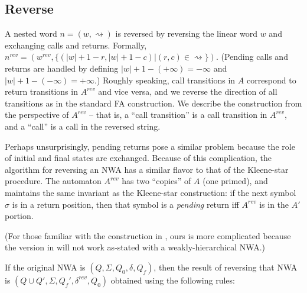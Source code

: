 \subsection{Reverse}
\label{Se:Reverse}

A nested word $n = (w, \rightsquigarrow)$ is reversed by reversing the linear
word $w$ and exchanging calls and returns. Formally,
$n^{rev} = (w^{rev}, \{(|w|+1-r, |w|+1-c) | (r,c)
\in\rightsquigarrow\})$. (Pending calls and returns are handled by defining
$|w|+1-(+\infty) = -\infty$ and $|w|+1-(-\infty) = +\infty$.) Roughly
speaking, call transitions in $A$ correspond to return transitions in
$A^{rev}$ and vice versa, and we reverse the direction of all transitions as
in the standard FA construction. We describe the construction from the
perspective of $A^{rev}$ -- that is, a ``call transition'' is a call
transition in $A^{rev}$, and a ``call'' is a call in the reversed string.

Perhaps unsurprisingly, pending returns pose a similar problem because the
role of initial and final states are exchanged. Because of this complication,
the algorithm for reversing an NWA has a similar flavor to that of the
Kleene-star procedure. The automaton $A^{rev}$ has two ``copies'' of $A$ (one
primed), and maintains the same invariant as the Kleene-star construction: if
the next symbol $\sigma$ is in a return position, then that symbol is a
\emph{pending} return iff $A^{rev}$ is in the $A'$ portion.

(For those familiar with the construction in \cite{JACM:AM2009}, ours is more
complicated because the version in \cite{JACM:AM2009} will not work as-stated
with a weakly-hierarchical NWA.)

If the original NWA is $(Q, \Sigma, Q_0, \delta, Q_f)$, then the result of
reversing that NWA is $(Q \cup Q', \Sigma, Q_f', \delta^{rev}, Q_0)$ obtained using
the following rules:

